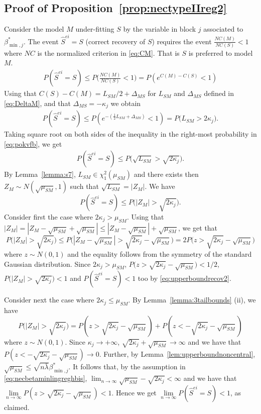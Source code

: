 \documentclass[
  12pt]{article}
\begin{document}
\subsection{Proof of Proposition~\ref{prop:nectypeIIreg2}}
Consider the model $M$ under-fitting $S$ by the variable in block $j$ associated to $\beta_{\min,j}^*$. The event $\hat{S}^{ei}=S$ (correct recovery of $S$) requires the event $\frac{NC(M)}{NC(S)}<1$ where $NC$ is the normalized criterion in \eqref{eq:CM}. That is $S$ is preferred to model $M$. 
\begin{align*}
P(\hat{S}^{ei}=S) 
\leq P\Big(\frac{NC(M)}{NC(S)}<1\Big)
= P \left( e^{C(M)-C(S)} <1 \right)
\end{align*}
Using that $C(S)-C(M)=L_{SM}/2 + \Delta_{MS}$ for $L_{SM}$ and $\Delta_{MS}$ defined in \eqref{eq:DeltaM}, and that $\Delta_{MS}=-\kappa_j$ we obtain
\begin{align}\label{eq:pokvfb}
P(\hat{S}^{ei}=S) 
\leq  P \left(e^{-(\frac{1}{2} L_{SM} + \Delta_{MS})} < 1 \right) =
P\Big(L_{SM}>2\kappa_j\Big).
\end{align}
Taking square root on both sides of the inequality in the right-most probability in \eqref{eq:pokvfb}, we get
\begin{align}\label{eq:pokvfc}
P(\hat{S}^{ei}=S) 
\leq P\Big(\sqrt{L_{SM}}>\sqrt{2\kappa_j}\Big).
\end{align}
By Lemma~\ref{lemma:s7}, $L_{SM}\in \chi^2_1(\mu_{SM})$ and  there exists then $Z_M\sim N(\sqrt{\mu_{SM}},1)$ such that $\sqrt{L_{SM}}=|Z_M|$. We have
\begin{equation}\label{eq:upperboundrecov2}
    P(\hat{S}^{ei}=S) \leq  P\big(|Z_M|>\sqrt{2\kappa_j}\big).
\end{equation}
Consider first the case where $2\kappa_j>\mu_{SM}$. Using that $|Z_M|=|Z_M-\sqrt{\mu_{SM}}+\sqrt{\mu_{SM}}|\leq  |Z_M-\sqrt{\mu_{SM}}| + \sqrt{\mu_{SM}}$, we get that 
$$P\big(|Z_M|>\sqrt{2\kappa_j}\big)\leq P\big(|Z_M-\sqrt{\mu_{SM}}|>\sqrt{2\kappa_j}-\sqrt{\mu_{SM}}\big) = 2P\big(z>\sqrt{2\kappa_j}-\sqrt{\mu_{SM}}\big)$$
where $z\sim N(0,1)$ and the equality follows from the symmetry of the standard Gaussian distribution. Since $2\kappa_j>\mu_{SM}$, $P\big(z>\sqrt{2\kappa_j}-\sqrt{\mu_{SM}}\big)<1/2$, $P\big(|Z_M|>\sqrt{2\kappa_j}\big)<1$ and $P(\hat{S}^{ei}=S)<1$ too by \eqref{eq:upperboundrecov2}.

Consider next the case where $2\kappa_j\leq\mu_{SM}$. By Lemma~\ref{lemma:3tailbounds} (ii), we have
$$P\big(|Z_M|>\sqrt{2\kappa_j}\big)
    = P\left(z>\sqrt{2\kappa_j}-\sqrt{\mu_{SM}}\right) + P\left(z<-\sqrt{2\kappa_j}-\sqrt{\mu_{SM}}\right)$$ where $z\sim N(0,1)$. Since $\kappa_j\to+\infty$, $\sqrt{2\kappa_j}+\sqrt{\mu_{SM}}\to\infty$ and we have that $P(z<-\sqrt{2\kappa_j}-\sqrt{\mu_{SM}}) \to 0$.  
    Further, by Lemma~\ref{lem:upperboundnoncentral}, $\sqrt{\mu_{SM}}\leq \sqrt{n\bar{\lambda}}\beta_{\min,j}^*$. It follows that, by the assumption in \eqref{eq:necbetaminlingreghbis}, $\lim_{n\to \infty}\sqrt{\mu_{SM}}-\sqrt{2\kappa_j} < \infty$ and we have that $\underset{n \to \infty}{\lim}P\left(z>\sqrt{2\kappa_j}-\sqrt{\mu_{SM}}\right)<1$. Hence we get $\underset{n \to \infty}{\lim}P\left(\hat{S}^{ei} = S \right)<1$, as claimed.
\end{document}
